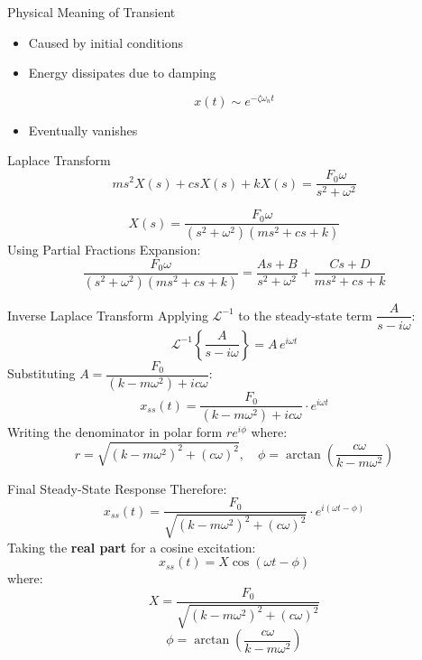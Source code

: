 \documentclass{beamer}
\begin{document}
\begin{frame}{Physical Meaning of Transient}
\begin{itemize}
    \item Caused by initial conditions
    \item Energy dissipates due to damping
\end{itemize}

\[
x(t) \sim e^{-\zeta \omega_n t}
\]

\begin{itemize}
    \item Eventually vanishes
\end{itemize}
\end{frame}


\begin{frame}{Laplace Transform}
\[
m s^2 X(s) + c s X(s) + k X(s) = \frac{F_0 \omega}{s^2 + \omega^2}
\]

\[
X(s) = \frac{F_0 \omega}{(s^2 + \omega^2)(ms^2 + cs + k)}
\]
Using Partial Fractions Expansion:\\
\[
\frac{F_0 \omega}{(s^2 + \omega^2)(m s^2 + c s + k)}
=
\frac{A s + B}{s^2 + \omega^2}
+
\frac{C s + D}{m s^2 + c s + k}
\]


\end{frame}


\begin{frame}{Inverse Laplace Transform}
    Applying $\mathcal{L}^{-1}$ to the steady-state term $\dfrac{A}{s - i\omega}$:
    \[
        \mathcal{L}^{-1}\left\{\frac{A}{s - i\omega}\right\} = A\, e^{i\omega t}
    \]
    Substituting $A = \dfrac{F_0}{(k - m\omega^2) + ic\omega}$:
    \[
        x_{ss}(t) = \frac{F_0}{(k - m\omega^2) + ic\omega} \cdot e^{i\omega t}
    \]
    Writing the denominator in polar form $r e^{i\phi}$ where:
    \[
        r = \sqrt{(k-m\omega^2)^2 + (c\omega)^2}, \quad
        \phi = \arctan\!\left(\frac{c\omega}{k - m\omega^2}\right)
    \]
\end{frame}

\begin{frame}{Final Steady-State Response}
    Therefore:
    \[
        x_{ss}(t) = \frac{F_0}{\sqrt{(k - m\omega^2)^2 + (c\omega)^2}} \cdot e^{i(\omega t - \phi)}
    \]
    Taking the \textbf{real part} for a cosine excitation:
    \[
        \boxed{x_{ss}(t) = X \cos(\omega t - \phi)}
    \]
    where:
    \[
        X = \frac{F_0}{\sqrt{(k - m\omega^2)^2 + (c\omega)^2}}
    \]
    \[
        \phi = \arctan\!\left(\frac{c\omega}{k - m\omega^2}\right)
    \]
 
\end{frame}
\end{document}
